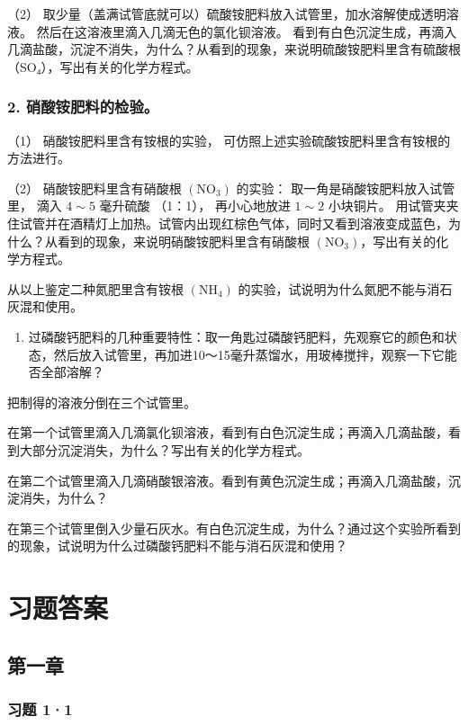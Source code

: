 （2）
取少量（盖满试管底就可以）硫酸铵肥料放入试管里，加水溶解使成透明溶液。
然后在这溶液里滴入几滴无色的氯化钡溶液。
看到有白色沉淀生成，再滴入几滴盐酸，沉淀不消失，为什么？从看到的现象，来说明硫酸铵肥料里含有硫酸根（SO₄），写出有关的化学方程式。

\subsection{2. 硝酸铵肥料的检验。}

（1） 硝酸铵肥料里含有铵根的实验，
可仿照上述实验硫酸铵肥料里含有铵根的方法进行。

（2） 硝酸铵肥料里含有硝酸根 \(\left(\mathrm{NO}_{3}\right)\) 的实验：
取一角是硝酸铵肥料放入试管里， 滴入 \(4 \sim 5\) 毫升硫酸 （1：1），
再小心地放进 \(1 \sim 2\) 小块铜片。
用试管夹夹住试管并在酒精灯上加热。试管内出现红棕色气体，同时又看到溶液变成蓝色，为什么？从看到的现象，来说明硝酸铵肥料里含有硝酸根
\(\left(\mathrm{NO}_{3}\right)\)，写出有关的化学方程式。

从以上鉴定二种氮肥里含有铵根 \(\left(\mathrm{NH}_{4}\right)\)
的实验，试说明为什么氮肥不能与消石灰混和使用。

\begin{enumerate}[start=3]
\item
  过磷酸钙肥料的几种重要特性：取一角匙过磷酸钙肥料，先观察它的颜色和状态，然后放入试管里，再加进10～15毫升蒸馏水，用玻棒搅拌，观察一下它能否全部溶解？
\end{enumerate}

把制得的溶液分倒在三个试管里。

在第一个试管里滴入几滴氯化钡溶液，看到有白色沉淀生成；再滴入几滴盐酸，看到大部分沉淀消失，为什么？写出有关的化学方程式。

在第二个试管里滴入几滴硝酸银溶液。看到有黄色沉淀生成；再滴入几滴盐酸，沉淀消失，为什么？

在第三个试管里倒入少量石灰水。有白色沉淀生成，为什么？通过这个实验所看到的现象，试说明为什么过磷酸钙肥料不能与消石灰混和使用？

\chapter{习题答案}

\section{第一章}

\subsection{习题 1·1}

